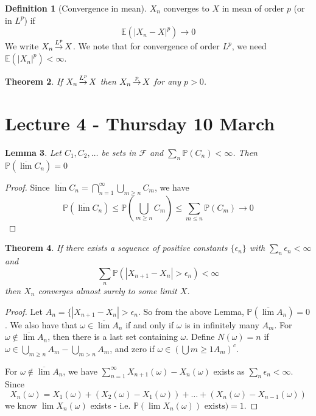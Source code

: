 \documentclass[10pt, oneside, reqno]{amsart}
\theoremstyle{plain}%
\newtheorem{thm}{Theorem}[section]
\newtheorem{lem}[thm]{Lemma}
\theoremstyle{definition}
\newtheorem{defn}[thm]{Definition}
\theoremstyle{remark}
\newcommand{\sigf}{\mathcal{F}}
\newcommand{\E}{\mathbb{E}}
\renewcommand{\P}{\mathbb{P}}
\def\cip{\,{\buildrel p \over \rightarrow}\,}
\def\clp{\,{\buildrel L^p \over \rightarrow}\,}
\begin{document}
\begin{defn}[Convergence in mean]
    $X_n$ converges to $X$ in mean of order $p$ (or in $L^p$) if\[
        \E(|X_n - X|^p) \rightarrow 0
    \]
    We write $X_n \clp X$.  We note that for convergence of order $L^p$, we need $\E(|X_n|^p) < \infty$.
\end{defn}

\begin{thm}
    If $X_n \clp X$ then $X_n \cip X$ for any $p > 0$.
\end{thm}

\section{Lecture 4 - Thursday 10 March} %
\label{sec:lecture_4_thursday_10_march}

\begin{lem}
    Let $C_1, C_2, \dots$ be sets in $\sigf$ and $\sum_n \P(C_n) < \infty$.  Then $\P(\overline{\lim} C_n) = 0$
\end{lem}
\begin{proof}
    Since $\overline{\lim} C_n = \bigcap_{n = 1}^\infty \bigcup_{m \geq n} C_m$, we have
    \[
        \P(\overline{\lim} C_n) \leq \P(\bigcup_{m \geq n} C_m) \leq \sum_{m \leq n} \P(C_m) \rightarrow 0 
    \]
\end{proof}

\begin{thm}\label{thm:4}
    If there exists a sequence of positive constants $ \{ \epsilon_n \}$ with $\sum_{n} \epsilon_n < \infty$ and \[
        \sum_{n} \P( |X_{n + 1} - X_n | > \epsilon_n) < \infty
    \] then $X_n$ converges almost surely to some limit $X$.
\end{thm}

\begin{proof}
    Let $A_n = \{ | X_{n+1} - X_n | > \epsilon_n$.  So from the above Lemma, $\P( \overline\lim A_n) = 0$.  We also have that $\omega \in \overline\lim A_n $ if and only if $\omega$ is in infinitely many $A_m$. For $\omega \notin \overline \lim A_n$, then there is a last set containing $\omega$.  Define $N(\omega) = n$ if $\omega \in \bigcup_{m \geq n} A_m - \bigcup_{m > n} A_m$, and zero if $\omega \in ( \bigcup{m \geq 1} A_m)^c$.
    
    For $\omega \notin \overline \lim A_n$, we have $\sum_{n = 1}^\infty X_{n+1}(\omega) - X_n(\omega)$ exists as $\sum_n \epsilon_n  < \infty$.  Since \[
        X_n(\omega) = X_1(\omega) + ( X_2(\omega) - X_1( \omega) ) + \dots + ( X_n( \omega) - X_{n-1}(\omega))
    \] we know $\lim X_n(\omega)$ exists - i.e. $\P( \lim X_n( \omega)) \text{ exists} ) = 1$.
\end{proof}
\end{document}
